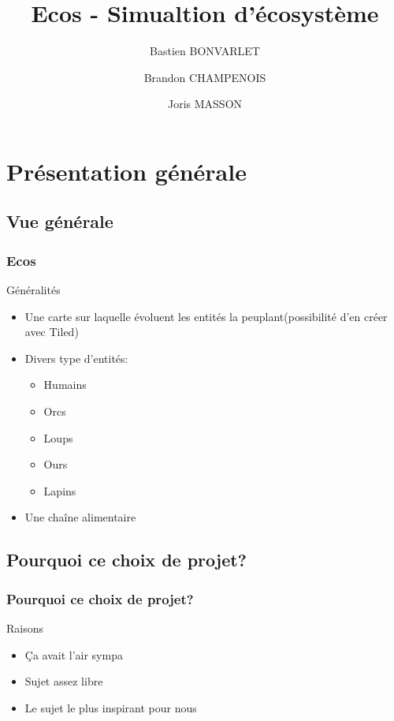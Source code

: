 \documentclass{beamer}
\title{Ecos - Simualtion d'écosystème}
\author{Bastien BONVARLET \and Brandon CHAMPENOIS \and Joris MASSON}
\institute{Université de Caen Normandie}
\begin{document}
\begin{frame}
\titlepage
\end{frame}

\begin{frame}
\tableofcontents[hideallsubsections]
\end{frame}



\section{Présentation générale}
\subsection{Vue générale}

\begin{frame} \frametitle{Ecos}
	\begin{block}{Généralités}
		\begin{itemize}
			\item Une carte sur laquelle évoluent les entités la peuplant(possibilité d'en créer avec Tiled)
			\item Divers type d'entités: 									\begin{itemize}
					\item Humains
					\item Orcs
					\item Loups
					\item Ours
					\item Lapins
				\end{itemize}
			\item Une chaîne alimentaire
		\end{itemize}
	\end{block}
\end{frame}

\subsection{Pourquoi ce choix de projet?}
\begin{frame} \frametitle{Pourquoi ce choix de projet?}
	\begin{block}{Raisons}
		\begin{itemize}
			\item Ça avait l'air sympa
			\item Sujet assez libre
			\item Le sujet le plus inspirant pour nous
		\end{itemize}
	\end{block}
\end{frame}
\end{document}
